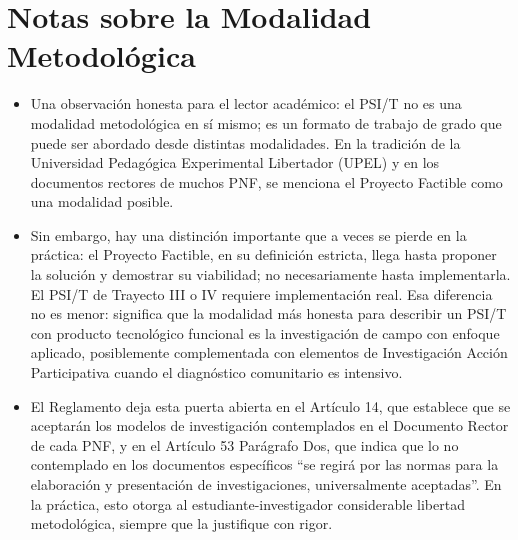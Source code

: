 \documentclass[14pt,a4paper,oneside]{extbook}
\begin{document}
\section{Notas sobre la Modalidad Metodológica}
\begin{itemize}
\item Una observación honesta para el lector académico: el PSI/T no es una modalidad metodológica en sí mismo; es un formato de trabajo de grado que puede ser abordado desde distintas modalidades. En la tradición de la Universidad Pedagógica Experimental Libertador (UPEL) y en los documentos rectores de muchos PNF, se menciona el Proyecto Factible como una modalidad posible.
\item Sin embargo, hay una distinción importante que a veces se pierde en la práctica: el Proyecto Factible, en su definición estricta, llega hasta proponer la solución y demostrar su viabilidad; no necesariamente hasta implementarla. El PSI/T de Trayecto III o IV requiere implementación real. Esa diferencia no es menor: significa que la modalidad más honesta para describir un PSI/T con producto tecnológico funcional es la investigación de campo con enfoque aplicado, posiblemente complementada con elementos de Investigación Acción Participativa cuando el diagnóstico comunitario es intensivo.
\item El Reglamento deja esta puerta abierta en el Artículo 14, que establece que se aceptarán los modelos de investigación contemplados en el Documento Rector de cada PNF, y en el Artículo 53 Parágrafo Dos, que indica que lo no contemplado en los documentos específicos \enquote{se regirá por las normas para la elaboración y presentación de investigaciones, universalmente aceptadas}. En la práctica, esto otorga al estudiante-investigador considerable libertad metodológica, siempre que la justifique con rigor.
\end{itemize}
\end{document}

